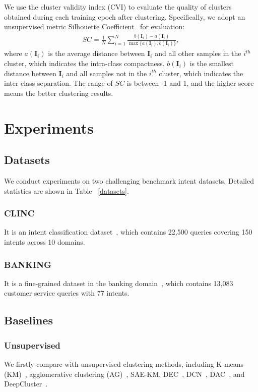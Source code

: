 \documentclass[letterpaper]{article} \usepackage{aaai21}  \usepackage{times}  \usepackage{helvet} \usepackage{courier}  \usepackage[hyphens]{url}  \usepackage{graphicx} \urlstyle{rm} \def\UrlFont{\rm}  \usepackage{natbib}  \usepackage{caption} \frenchspacing  \setlength{\pdfpagewidth}{8.5in}  \setlength{\pdfpageheight}{11in}  \usepackage{amsmath}
\begin{document}
	We use the cluster validity index (CVI) to evaluate the quality of clusters obtained during each training epoch after clustering. Specifically, we adopt an unsupervised metric Silhouette Coefficient~\cite{ROUSSEEUW198753} for evaluation:
	\begin{align}
		SC=\frac{1}{N}\sum_{i=1}^{N} \frac{b(\boldsymbol{I}_{i})-a(\boldsymbol{I}_{i})}{\max \{a(\boldsymbol{I}_{i}), b(\boldsymbol{I}_{i})\}},
		\label{8}
	\end{align}
	where $a(\boldsymbol{I}_{i})$ is the average distance between $\boldsymbol{I}_{i}$ and all other samples in the $i^{th}$ cluster, which indicates the intra-class compactness. $b(\boldsymbol{I}_{i})$ is the smallest distance between $\boldsymbol{I}_{i}$ and all samples not in the $i^{th}$ cluster, which indicates the inter-class separation. The range of $SC$ is between -1 and 1, and the higher score means the better clustering results.
	
	
	
	
	\section{Experiments}
	
	\subsection{Datasets}
	We conduct experiments on two challenging benchmark intent datasets. Detailed statistics are shown in Table ~\ref{datasets}.
	\subsubsection{CLINC} It is an intent classification dataset~\cite{larson-etal-2019-evaluation}, which contains 22,500 queries covering 150 intents across 10 domains.
	\subsubsection{BANKING} It is a fine-grained dataset in the banking domain~\cite{Casanueva2020}, which contains 13,083 customer service queries with 77 intents.
	\subsection{Baselines}
	\subsubsection{Unsupervised}
	We firstly compare with unsupervised clustering methods, including K-means (KM)~\cite{macqueen1967some}, agglomerative clustering (AG)~\cite{gowda1978agglomerative}, SAE-KM, DEC~\cite{xie2016unsupervised}, DCN~\cite{yang2017towards}, DAC~\cite{chang2017deep}, and DeepCluster~\cite{caron2018deep}.
\end{document}
